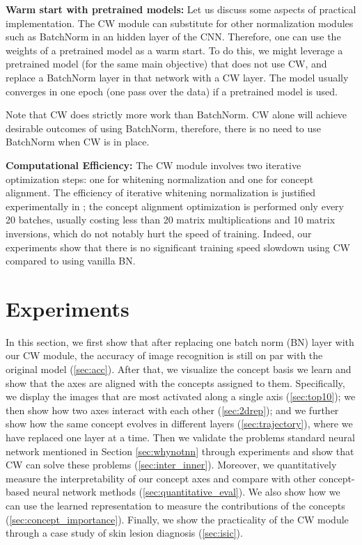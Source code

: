 \documentclass{article}
\begin{document}
\textbf{Warm start with pretrained models:} Let us discuss some aspects of practical implementation. The CW module can substitute for other normalization modules such as BatchNorm in an hidden layer of the CNN. Therefore, one can use the weights of a pretrained model as a warm start. To do this, we might leverage a pretrained model (for the same main objective) that does not use CW, and replace a BatchNorm layer in that network with a CW layer. The model usually converges in one epoch (one pass over the data) if a pretrained model is used.

Note that CW does strictly more work than BatchNorm. CW alone will achieve desirable outcomes of using BatchNorm, therefore, there is no need to use BatchNorm when CW is in place. 

\textbf{Computational Efficiency:} The CW module involves two iterative optimization steps: one for whitening normalization and one for concept alignment. The efficiency of iterative whitening normalization is justified experimentally in \cite{huang2019iterative}; the concept alignment optimization is performed only every 20 batches, usually costing less than 20 matrix multiplications and 10 matrix inversions, which do not notably hurt the speed of training. Indeed, our experiments show that there is no significant training speed slowdown using CW compared to using vanilla BN.


\section{Experiments}
\label{sec:experiment}
In this section, we first show that after replacing one batch norm (BN) layer with our CW module, the accuracy of image recognition is still on par with the original model (\ref{sec:acc}). After that, we visualize the concept basis we learn and show that the axes are aligned with the concepts assigned to them. Specifically, we display the images that are most activated along a single axis (\ref{sec:top10}); we then show how two axes interact with each other (\ref{sec:2drep}); and we further show how the same concept evolves in different layers (\ref{sec:trajectory}), where we have replaced one layer at a time. Then we validate the problems standard neural network mentioned in Section \ref{sec:whynotnn} through experiments and show that CW can solve these problems (\ref{sec:inter_inner}). Moreover, we quantitatively measure the interpretability of our concept axes and compare with other concept-based neural network methods (\ref{sec:quantitative_eval}). We also show how we can use the learned representation to measure the contributions of the concepts (\ref{sec:concept_importance}). Finally, we show the practicality of the CW module through a case study of skin lesion diagnosis (\ref{sec:isic}).
\end{document}
